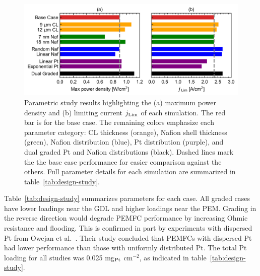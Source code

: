 \documentclass[final,3p,times,twocolumn]{elsarticle}    %
\begin{document}
\begin{figure}[!htb]
    \centering
    \includegraphics[width=6.238in]{figures/bar-charts-6_238in.png}
    \caption{Parametric study results highlighting the (a) maximum power density and (b) limiting current $j_{\rm Lim}$ of each simulation. The red bar is for the base case. The remaining colors emphasize each parameter category: CL thickness (orange), Nafion shell thickness (green), Nafion distribution (blue), Pt distribution (purple), and dual graded Pt and Nafion distributions (black). Dashed lines mark the the base case performance for easier comparison against the others. Full parameter details for each simulation are summarized in table~\ref{tab:design-study}.}
    \label{fig:bar-charts}
\end{figure}


Table~\ref{tab:design-study} summarizes parameters for each case. All graded cases have lower loadings near the GDL and higher loadings near the PEM. Grading in the reverse direction would degrade PEMFC performance by increasing Ohmic resistance and flooding. This is confirmed in part by experiments with dispersed Pt from Owejan et al.~\cite{bib:owejan_2013}. Their study concluded that PEMFCs with dispersed Pt had lower performance than those with uniformly distributed Pt. The total Pt loading for all studies was 0.025 mg$_{\rm Pt}$ cm$^{-2}$, as indicated in table~\ref{tab:design-study}.  
\end{document}
